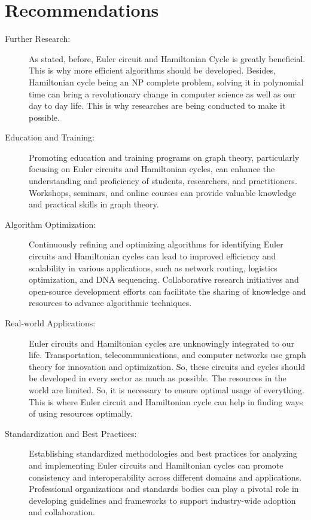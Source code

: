 \documentclass[14pt, times, a4paper]{extarticle}
\begin{document}
\section{Recommendations}
\begin{description}
    \item[Further Research:] As stated, before, Euler circuit and Hamiltonian Cycle is greatly beneficial. This is why more efficient algorithms should be developed. Besides, Hamiltonian cycle being an NP complete problem, solving it in polynomial time can bring a revolutionary change in computer science as well as our day to day life. This is why researches are being conducted to make it possible.
    
    \item[Education and Training:] Promoting education and training programs on graph theory, particularly focusing on Euler circuits and Hamiltonian cycles, can enhance the understanding and proficiency of students, researchers, and practitioners. Workshops, seminars, and online courses can provide valuable knowledge and practical skills in graph theory.
    
    \item[Algorithm Optimization:] Continuously refining and optimizing algorithms for identifying Euler circuits and Hamiltonian cycles can lead to improved efficiency and scalability in various applications, such as network routing, logistics optimization, and DNA sequencing. Collaborative research initiatives and open-source development efforts can facilitate the sharing of knowledge and resources to advance algorithmic techniques.
    
    \item[Real-world Applications:] Euler circuits and Hamiltonian cycles are unknowingly integrated to our life. Transportation, telecommunications, and computer networks use graph theory for innovation and optimization. So, these circuits and cycles should be developed in every sector as much as possible. The resources in the world are limited. So, it is necessary to ensure optimal usage of everything. This is where Euler circuit and Hamiltonian cycle can help in finding ways of using resources optimally.
    
    \item[Standardization and Best Practices:] Establishing standardized methodologies and best practices for analyzing and implementing Euler circuits and Hamiltonian cycles can promote consistency and interoperability across different domains and applications. Professional organizations and standards bodies can play a pivotal role in developing guidelines and frameworks to support industry-wide adoption and collaboration.
\end{description}
\end{document}
